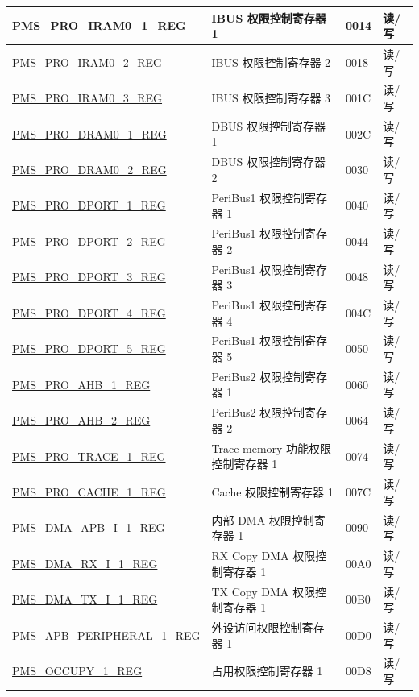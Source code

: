 \begin{longtable}{ |m{6cm} |m{7.2cm} | m{1.3cm} |m{1cm} | }
\hyperref[regdesc:PMSPROIRAM01REG]{PMS\_PRO\_IRAM0\_1\_REG} & IBUS 权限控制寄存器 1& \hexprefix{}0014 & 读/写 \\ \hline
\hyperref[regdesc:PMSPROIRAM02REG]{PMS\_PRO\_IRAM0\_2\_REG} & IBUS 权限控制寄存器 2 & \hexprefix{}0018 & 读/写 \\ \hline
\hyperref[regdesc:PMSPROIRAM03REG]{PMS\_PRO\_IRAM0\_3\_REG} & IBUS 权限控制寄存器 3 & \hexprefix{}001C & 读/写 \\ \hline
\hyperref[regdesc:PMSPRODRAM01REG]{PMS\_PRO\_DRAM0\_1\_REG} & DBUS 权限控制寄存器 1 & \hexprefix{}002C & 读/写 \\ \hline
\hyperref[regdesc:PMSPRODRAM02REG]{PMS\_PRO\_DRAM0\_2\_REG} & DBUS 权限控制寄存器 2 & \hexprefix{}0030 & 读/写 \\ \hline
\hyperref[regdesc:PMSPRODPORT1REG]{PMS\_PRO\_DPORT\_1\_REG} & PeriBus1 权限控制寄存器 1 & \hexprefix{}0040 & 读/写 \\ \hline
\hyperref[regdesc:PMSPRODPORT2REG]{PMS\_PRO\_DPORT\_2\_REG} & PeriBus1 权限控制寄存器 2 & \hexprefix{}0044 & 读/写 \\ \hline
\hyperref[regdesc:PMSPRODPORT3REG]{PMS\_PRO\_DPORT\_3\_REG} & PeriBus1 权限控制寄存器 3 & \hexprefix{}0048 & 读/写 \\ \hline
\hyperref[regdesc:PMSPRODPORT4REG]{PMS\_PRO\_DPORT\_4\_REG} & PeriBus1 权限控制寄存器 4 & \hexprefix{}004C & 读/写 \\ \hline
\hyperref[regdesc:PMSPRODPORT5REG]{PMS\_PRO\_DPORT\_5\_REG} & PeriBus1 权限控制寄存器 5 & \hexprefix{}0050 & 读/写 \\ \hline
\hyperref[regdesc:PMSPROAHB1REG]{PMS\_PRO\_AHB\_1\_REG} & PeriBus2 权限控制寄存器 1 & \hexprefix{}0060 & 读/写 \\ \hline
\hyperref[regdesc:PMSPROAHB2REG]{PMS\_PRO\_AHB\_2\_REG} & PeriBus2 权限控制寄存器 2 & \hexprefix{}0064 & 读/写 \\ \hline
\hyperref[regdesc:PMSPROTRACE1REG]{PMS\_PRO\_TRACE\_1\_REG} & Trace memory 功能权限控制寄存器 1 & \hexprefix{}0074 & 读/写 \\ \hline
\hyperref[regdesc:PMSPROCACHE1REG]{PMS\_PRO\_CACHE\_1\_REG} & Cache 权限控制寄存器 1 & \hexprefix{}007C & 读/写 \\ \hline
\hyperref[regdesc:PMSDMAAPBI1REG]{PMS\_DMA\_APB\_I\_1\_REG} & 内部 DMA 权限控制寄存器 1 & \hexprefix{}0090 & 读/写 \\ \hline
\hyperref[regdesc:PMSDMARXI1REG]{PMS\_DMA\_RX\_I\_1\_REG} & RX Copy DMA 权限控制寄存器 1 & \hexprefix{}00A0 & 读/写 \\ \hline
\hyperref[regdesc:PMSDMATXI1REG]{PMS\_DMA\_TX\_I\_1\_REG} & TX Copy DMA 权限控制寄存器 1 & \hexprefix{}00B0 & 读/写 \\ \hline
\hyperref[regdesc:PMSAPBPERIPHERAL1REG]{PMS\_APB\_PERIPHERAL\_1\_REG} & 外设访问权限控制寄存器 1 & \hexprefix{}00D0 & 读/写 \\ \hline
\hyperref[regdesc:PMSOCCUPY1REG]{PMS\_OCCUPY\_1\_REG} & 占用权限控制寄存器 1 & \hexprefix{}00D8 & 读/写 \\ \hline


\end{longtable}
